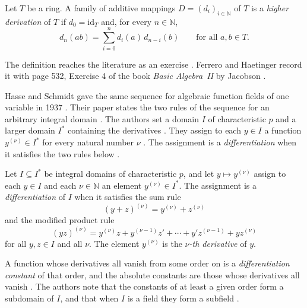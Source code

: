 \begin{definition}\label{def:higher:hd}
Let $T$ be a ring. A family of additive mappings
$D=(d_i)_{i\in\mathbb{N}}$ of $T$ is a \emph{higher derivation} of $T$ if
$d_0=\mathrm{id}_T$ and, for every $n\in\mathbb{N}$,
\begin{equation*}
d_n(ab)=\sum_{i=0}^{n} d_i(a)\,d_{n-i}(b)
\qquad\text{for all }a,b\in T.
\end{equation*}
\end{definition}

The definition reaches the literature as an exercise
\cite[p.~2323]{FerreroHaetinger2002}. Ferrero and Haetinger record it with
page 532, Exercise 4 of the book \emph{Basic Algebra~II} by Jacobson
\cite[p.~2323]{FerreroHaetinger2002}.

Hasse and Schmidt gave the same sequence for algebraic function fields of one
variable in 1937 \cite[pp.~215--223]{HasseSchmidt1937}. Their paper states the
two rules of the sequence for an arbitrary integral domain
\cite[pp.~223--224]{HasseSchmidt1937}. The authors set a domain $I$ of
characteristic $p$ and a larger domain $I^{*}$ containing the derivatives
\cite[p.~224]{HasseSchmidt1937}. They assign to each $y\in I$ a function
$y^{(\nu)}\in I^{*}$ for every natural number $\nu$
\cite[p.~224]{HasseSchmidt1937}. The assignment is a \emph{differentiation}
when it satisfies the two rules below \cite[p.~224]{HasseSchmidt1937}.

\begin{definition}\label{def:higher:hsrules}
Let $I\subseteq I^{*}$ be integral domains of characteristic $p$, and let
$y\mapsto y^{(\nu)}$ assign to each $y\in I$ and each $\nu\in\mathbb{N}$ an
element $y^{(\nu)}\in I^{*}$. The assignment is a \emph{differentiation} of
$I$ when it satisfies the sum rule
\[
(y+z)^{(\nu)}=y^{(\nu)}+z^{(\nu)}
\]
and the modified product rule
\[
(yz)^{(\nu)}=y^{(\nu)}z+y^{(\nu-1)}z'+\cdots+y'z^{(\nu-1)}+yz^{(\nu)}
\]
for all $y,z\in I$ and all $\nu$. The element $y^{(\nu)}$ is the
\emph{$\nu$-th derivative} of $y$.
\end{definition}

A function whose derivatives all vanish from some order on is a
\emph{differentiation constant} of that order, and the absolute constants are
those whose derivatives all vanish \cite[p.~224]{HasseSchmidt1937}. The
authors note that the constants of at least a given order form a subdomain of
$I$, and that when $I$ is a field they form a subfield
\cite[p.~224]{HasseSchmidt1937}.


